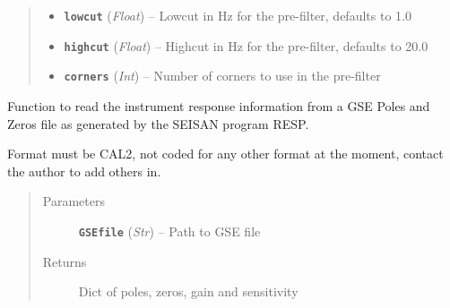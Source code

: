 \documentclass[a4paper,10pt,english]{sphinxmanual}
\begin{document}
\begin{fulllineitems}
\begin{quote}
\begin{description}
\begin{itemize}
\item {} 
\textbf{\texttt{lowcut}} (\emph{Float}) -- Lowcut in Hz for the pre-filter, defaults to 1.0

\item {} 
\textbf{\texttt{highcut}} (\emph{Float}) -- Highcut in Hz for the pre-filter, defaults to 20.0

\item {} 
\textbf{\texttt{corners}} (\emph{Int}) -- Number of corners to use in the pre-filter

\end{itemize}

\end{description}\end{quote}

\end{fulllineitems}


\begin{fulllineitems}
\label{utils:mag_calc._GSE2_PAZ_read}
Function to read the instrument response information from a GSE Poles and
Zeros file as generated by the SEISAN program RESP.

Format must be CAL2, not coded for any other format at the moment, contact
the author to add others in.
\begin{quote}\begin{description}
\item[{Parameters}] \leavevmode
\textbf{\texttt{GSEfile}} (\emph{Str}) -- Path to GSE file

\item[{Returns}] \leavevmode
Dict of poles, zeros, gain and sensitivity

\end{description}\end{quote}

\end{fulllineitems}

\end{document}
